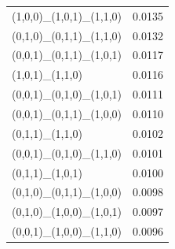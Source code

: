 \begin{minipage}[t]{\linewidth}
\begin{tabular}{@{}lr@{}}
(1,0,0)\_(1,0,1)\_(1,1,0)                         & 0.0135 \\
(0,1,0)\_(0,1,1)\_(1,1,0)                         & 0.0132 \\
(0,0,1)\_(0,1,1)\_(1,0,1)                         & 0.0117 \\
(1,0,1)\_(1,1,0)                                   & 0.0116 \\
(0,0,1)\_(0,1,0)\_(1,0,1)                         & 0.0111 \\
(0,0,1)\_(0,1,1)\_(1,0,0)                         & 0.0110 \\
(0,1,1)\_(1,1,0)                                   & 0.0102 \\
(0,0,1)\_(0,1,0)\_(1,1,0)                         & 0.0101 \\
(0,1,1)\_(1,0,1)                                   & 0.0100 \\
(0,1,0)\_(0,1,1)\_(1,0,0)                         & 0.0098 \\
(0,1,0)\_(1,0,0)\_(1,0,1)                         & 0.0097 \\
(0,0,1)\_(1,0,0)\_(1,1,0)                         & 0.0096 \\
\bottomrule
\end{tabular}
\end{minipage}
\hfill
